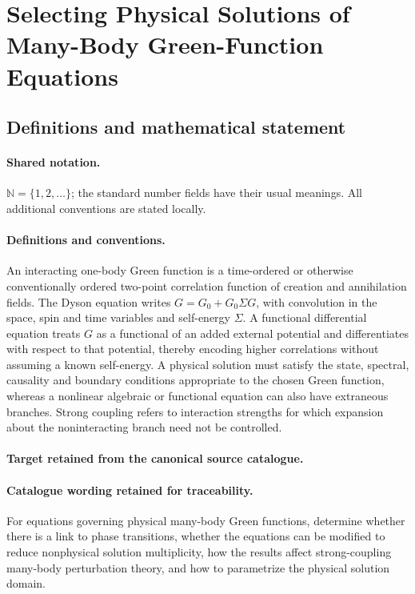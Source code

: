 \documentclass[11pt]{article}
\begin{document}
\section{Selecting Physical Solutions of Many-Body Green-Function Equations}\label{statement}

\subsection{Definitions and mathematical statement}

\paragraph{Shared notation.}$\mathbb N=\{1,2,\ldots\}$; the standard number fields have their usual meanings. All additional conventions are stated locally.


\paragraph{Definitions and conventions.}
An interacting one-body Green function is a time-ordered or otherwise conventionally ordered two-point correlation function of creation and annihilation fields. The Dyson equation writes $G=G_0+G_0\Sigma G$, with convolution in the space, spin and time variables and self-energy $\Sigma$. A functional differential equation treats $G$ as a functional of an added external potential and differentiates with respect to that potential, thereby encoding higher correlations without assuming a known self-energy. A physical solution must satisfy the state, spectral, causality and boundary conditions appropriate to the chosen Green function, whereas a nonlinear algebraic or functional equation can also have extraneous branches. Strong coupling refers to interaction strengths for which expansion about the noninteracting branch need not be controlled.

\paragraph{Target retained from the canonical source catalogue.}
\paragraph{Catalogue wording retained for traceability.}
For equations governing physical many-body Green functions, determine whether there is a link to phase transitions, whether the equations can be modified to reduce nonphysical solution multiplicity, how the results affect strong-coupling many-body perturbation theory, and how to parametrize the physical solution domain.
\end{document}
